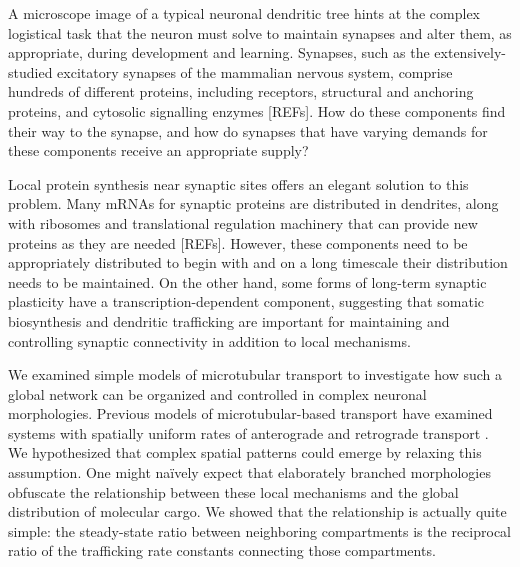 \documentclass[10pt]{wlpeerj}
\begin{document}
A microscope image of a typical neuronal dendritic tree hints at the complex logistical task that the neuron must solve to maintain synapses and alter them, as appropriate, during development and learning.
Synapses, such as the extensively-studied excitatory synapses of the mammalian nervous system, comprise hundreds of different proteins, including receptors, structural and anchoring proteins, and cytosolic signalling enzymes [REFs].
How do these components find their way to the synapse, and how do synapses that have varying demands for these components receive an appropriate supply?

Local protein synthesis near synaptic sites offers an elegant solution to this problem.
Many mRNAs for synaptic proteins are distributed in dendrites, along with ribosomes and translational regulation machinery that can provide new proteins as they are needed [REFs].
However, these components need to be appropriately distributed to begin with and on a long timescale their distribution needs to be maintained.
On the other hand, some forms of long-term synaptic plasticity have a transcription-dependent component, suggesting that somatic biosynthesis and dendritic trafficking are important for maintaining and controlling synaptic connectivity in addition to local mechanisms.

We examined simple models of microtubular transport to investigate how such a global network can be organized and controlled in complex neuronal morphologies.
Previous models of microtubular-based transport have examined systems with spatially uniform rates of anterograde and retrograde transport \citep{Smith_2001,Bressloff_2006}.
We hypothesized that complex spatial patterns could emerge by relaxing this assumption. One might na\"ively expect that elaborately branched morphologies obfuscate the relationship between these local mechanisms and the global distribution of molecular cargo.
We showed that the relationship is actually quite simple: the steady-state ratio between neighboring compartments is the reciprocal ratio of the trafficking rate constants connecting those compartments.
\end{document}
